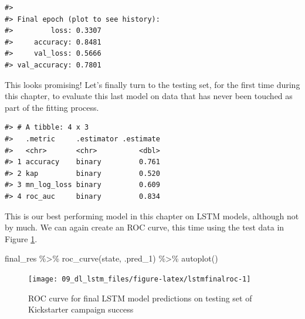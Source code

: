 \documentclass[
]{krantz}
\makeatletter
\newenvironment{Shaded}{\begin{snugshade}}{\end{snugshade}}
\newcommand{\AttributeTok}[1]{\textcolor[rgb]{0.77,0.63,0.00}{#1}}
\newcommand{\FunctionTok}[1]{\textcolor[rgb]{0.00,0.00,0.00}{#1}}
\newcommand{\NormalTok}[1]{#1}
\newcommand{\OtherTok}[1]{\textcolor[rgb]{0.56,0.35,0.01}{#1}}
\newcommand{\SpecialCharTok}[1]{\textcolor[rgb]{0.00,0.00,0.00}{#1}}
\newcommand{\StringTok}[1]{\textcolor[rgb]{0.31,0.60,0.02}{#1}}
\newenvironment{kframe}{%
\medskip{}
\setlength{\fboxsep}{.8em}
 \def\at@end@of@kframe{}%
 \ifinner\ifhmode%
  \def\at@end@of@kframe{\end{minipage}}%
  \begin{minipage}{\columnwidth}%
 \fi\fi%
 \def\FrameCommand##1{\hskip\@totalleftmargin \hskip-\fboxsep
 \colorbox{shadecolor}{##1}\hskip-\fboxsep
     \hskip-\linewidth \hskip-\@totalleftmargin \hskip\columnwidth}%
 \MakeFramed {\advance\hsize-\width
   \@totalleftmargin\z@ \linewidth\hsize
   \@setminipage}}%
 {\par\unskip\endMakeFramed%
 \at@end@of@kframe}
\renewenvironment{Shaded}{\begin{kframe}}{\end{kframe}}
\makeatother
\begin{document}
\begin{verbatim}
#> 
#> Final epoch (plot to see history):
#>         loss: 0.3307
#>     accuracy: 0.8481
#>     val_loss: 0.5666
#> val_accuracy: 0.7801
\end{verbatim}

This looks promising! Let's finally turn to the testing set, for the first time during this chapter, to evaluate this last model on data that has never been touched as part of the fitting process.

\begin{Shaded}
\end{Shaded}

\begin{verbatim}
#> # A tibble: 4 x 3
#>   .metric     .estimator .estimate
#>   <chr>       <chr>          <dbl>
#> 1 accuracy    binary         0.761
#> 2 kap         binary         0.520
#> 3 mn_log_loss binary         0.609
#> 4 roc_auc     binary         0.834
\end{verbatim}

This is our best performing model in this chapter on LSTM models, although not by much. We can again create an ROC curve, this time using the test data in Figure \ref{fig:lstmfinalroc}.

\begin{Shaded}
\begin{Highlighting}[]
\NormalTok{final\_res }\SpecialCharTok{\%\textgreater{}\%}
  \FunctionTok{roc\_curve}\NormalTok{(state, .pred\_1) }\SpecialCharTok{\%\textgreater{}\%}
  \FunctionTok{autoplot}\NormalTok{()}
\end{Highlighting}
\end{Shaded}

\begin{figure}

{\centering \texttt{[image: 09\_dl\_lstm\_files/figure-latex/lstmfinalroc-1]} 

}

\caption{ROC curve for final LSTM model predictions on testing set of Kickstarter campaign success}\label{fig:lstmfinalroc}
\end{figure}
\end{document}
